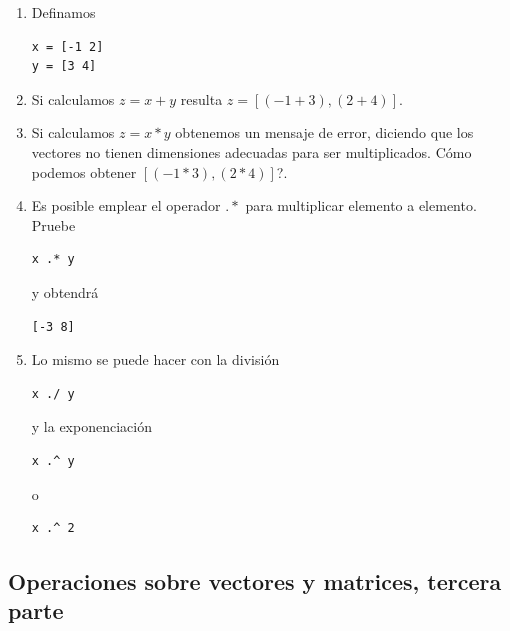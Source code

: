 \begin{enumerate}
\item Definamos
\begin{verbatim}
x = [-1 2]
y = [3 4]
\end{verbatim}

\item Si calculamos $z = x + y$ resulta $z = [(-1 + 3) , (2+ 4)]$.

\item Si calculamos $z = x * y$ obtenemos un mensaje de error,
  diciendo que los vectores no tienen dimensiones adecuadas para ser
  multiplicados. \textquestiondown C\'{o}mo podemos obtener 
  $[(-1 * 3), (2 * 4)]$?.

\item Es posible emplear el operador $.*$ para multiplicar elemento a
  elemento. Pruebe
\begin{verbatim}
x .* y
\end{verbatim}
y obtendr\'{a}
\begin{verbatim}
[-3 8]
\end{verbatim}

\item Lo mismo se puede hacer con la divisi\'{o}n 
\begin{verbatim}
x ./ y
\end{verbatim}
y la exponenciaci\'{o}n
\begin{verbatim}
x .^ y
\end{verbatim}
o
\begin{verbatim}
x .^ 2
\end{verbatim}

\end{enumerate}

\subsection{Operaciones sobre vectores y matrices, tercera parte}


